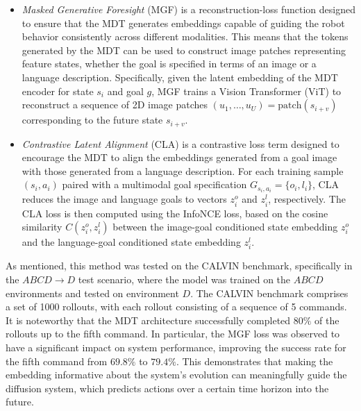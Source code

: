 \begin{itemize}
    \item \textit{Masked Generative Foresight} (MGF) is a reconstruction-loss function designed to ensure that the MDT generates embeddings capable of guiding the robot behavior consistently across different modalities. This means that the tokens generated by the MDT can be used to construct image patches representing feature states, whether the goal is specified in terms of an image or a language description. Specifically, given the latent embedding of the MDT encoder for state $s_i$ and goal $g$, MGF trains a Vision Transformer (ViT) to reconstruct a sequence of 2D image patches $(u_1, \dots, u_U) = \text{patch}(s_{i+v})$ corresponding to the future state $s_{i+v}$.
    \item \textit{Contrastive Latent Alignment} (CLA) is a contrastive loss term designed to encourage the MDT to align the embeddings generated from a goal image with those generated from a language description. For each training sample $(s_i, a_i)$ paired with a multimodal goal specification $G_{s_i,a_i} = \{o_i, l_i\}$, CLA reduces the image and language goals to vectors $z_i^o$ and $z_i^l$, respectively. The CLA loss is then computed using the InfoNCE loss, based on the cosine similarity $C(z_i^o, z_i^l)$ between the image-goal conditioned state embedding $z_i^o$ and the language-goal conditioned state embedding $z_i^l$.
\end{itemize}

As mentioned, this method was tested on the CALVIN benchmark, specifically in the $ABCD \rightarrow D$ test scenario, where the model was trained on the $ABCD$ environments and tested on environment $D$. The CALVIN benchmark comprises a set of 1000 rollouts, with each rollout consisting of a sequence of 5 commands. It is noteworthy that the MDT architecture successfully completed $80\%$ of the rollouts up to the fifth command. In particular, the MGF loss was observed to have a significant impact on system performance, improving the success rate for the fifth command from $69.8\%$ to $79.4\%$. This demonstrates that making the embedding informative about the system's evolution can meaningfully guide the diffusion system, which predicts actions over a certain time horizon into the future.

